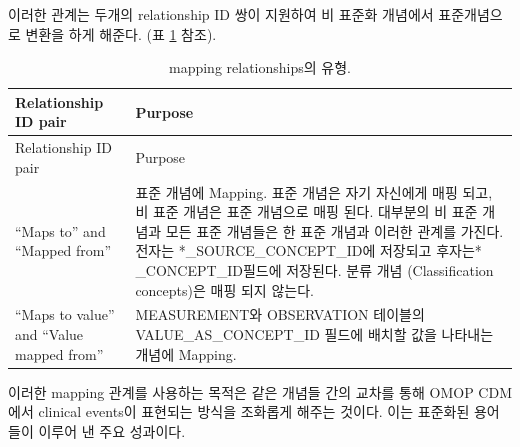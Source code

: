 \documentclass[11pt]{book}
\theoremstyle{definition}
\theoremstyle{definition}
\theoremstyle{definition}
\theoremstyle{remark}
\begin{document}
이러한 관계는 두개의 relationship ID 쌍이 지원하여 비 표준화 개념에서
표준개념으로 변환을 하게 해준다. (표 \ref{tab:mappingRelationships}
참조). 

\begin{longtable}[]{@{}ll@{}}
\caption{\label{tab:mappingRelationships} mapping relationships의
유형.}\tabularnewline
\toprule
\begin{minipage}[b]{0.20\columnwidth}\raggedright\strut
Relationship ID pair\strut
\end{minipage} & \begin{minipage}[b]{0.71\columnwidth}\raggedright\strut
Purpose\strut
\end{minipage}\tabularnewline
\midrule
\endfirsthead
\toprule
\begin{minipage}[b]{0.20\columnwidth}\raggedright\strut
Relationship ID pair\strut
\end{minipage} & \begin{minipage}[b]{0.71\columnwidth}\raggedright\strut
Purpose\strut
\end{minipage}\tabularnewline
\midrule
\endhead
\begin{minipage}[t]{0.20\columnwidth}\raggedright\strut
``Maps to'' and ``Mapped from''\strut
\end{minipage} & \begin{minipage}[t]{0.71\columnwidth}\raggedright\strut
표준 개념에 Mapping. 표준 개념은 자기 자신에게 매핑 되고, 비 표준 개념은
표준 개념으로 매핑 된다. 대부분의 비 표준 개념과 모든 표준 개념들은 한
표준 개념과 이러한 관계를 가진다. 전자는 *\_SOURCE\_CONCEPT\_ID에
저장되고 후자는* \_CONCEPT\_ID필드에 저장된다. 분류 개념 (Classification
concepts)은 매핑 되지 않는다.\strut
\end{minipage}\tabularnewline
\begin{minipage}[t]{0.20\columnwidth}\raggedright\strut
``Maps to value'' and ``Value mapped from''\strut
\end{minipage} & \begin{minipage}[t]{0.71\columnwidth}\raggedright\strut
MEASUREMENT와 OBSERVATION 테이블의 VALUE\_AS\_CONCEPT\_ID 필드에 배치할
값을 나타내는 개념에 Mapping.\strut
\end{minipage}\tabularnewline
\bottomrule
\end{longtable}

이러한 mapping 관계를 사용하는 목적은 같은 개념들 간의 교차를 통해 OMOP
CDM에서 clinical events이 표현되는 방식을 조화롭게 해주는 것이다. 이는
표준화된 용어들이 이루어 낸 주요 성과이다.
\end{document}
